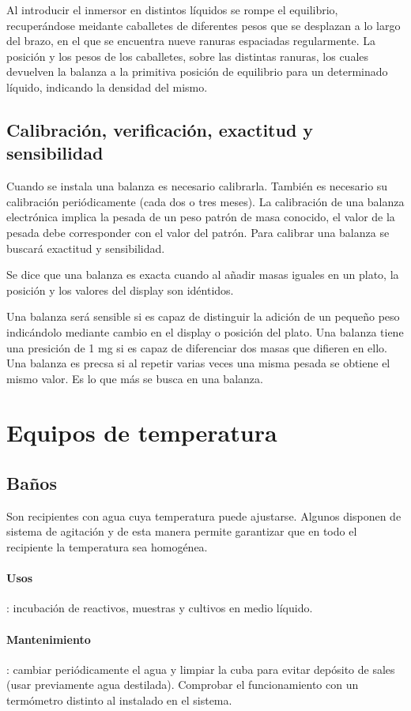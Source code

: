 Al introducir el inmersor en distintos líquidos se rompe el equilibrio, recuperándose meidante caballetes de diferentes pesos que se desplazan a lo largo del brazo, en el que se encuentra nueve ranuras espaciadas regularmente. La posición y los pesos de los caballetes, sobre las distintas ranuras, los cuales devuelven la balanza a la primitiva posición de equilibrio para un determinado líquido, indicando la densidad del mismo.
\subsection{Calibración, verificación, exactitud y sensibilidad}
Cuando se instala una balanza es necesario calibrarla. También es necesario su calibración periódicamente (cada dos o tres meses). La calibración de una balanza electrónica implica la pesada de un peso patrón de masa conocido, el valor de la pesada debe corresponder con el valor del patrón. Para calibrar una balanza se buscará exactitud y sensibilidad.

Se dice que una balanza es exacta cuando al añadir masas iguales en un plato, la posición y los valores del display son idéntidos.

Una balanza será sensible si es capaz de distinguir la adición de un pequeño peso  indicándolo mediante cambio en el display o posición del plato. Una balanza tiene una presición de 1 mg si es capaz de diferenciar dos masas que difieren en ello. Una balanza es precsa si al repetir varias veces una misma pesada se obtiene el mismo valor. Es lo que más se busca en una balanza.
\section{Equipos de temperatura}
\subsection{Baños}
Son recipientes con agua cuya temperatura puede ajustarse. Algunos disponen de sistema de agitación y de esta manera permite garantizar que en todo el recipiente la temperatura sea homogénea.
\paragraph{Usos}: incubación de reactivos, muestras y cultivos en medio líquido.
\paragraph{Mantenimiento}: cambiar periódicamente el agua y limpiar la cuba para evitar depósito de sales (usar previamente agua destilada). Comprobar el funcionamiento con un termómetro distinto al instalado en el sistema.
